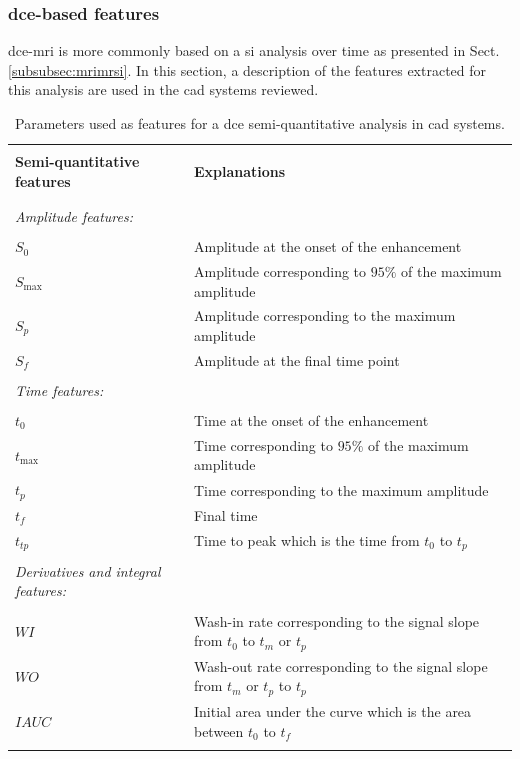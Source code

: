 \subsubsection{\ac{dce}-based features}\label{subsubsec:fddce}

\ac{dce}-\ac{mri} is more commonly based on a \ac{si} analysis over time as presented in Sect. \ref{subsubsec:mrimrsi}. In this section, a description of the features extracted for this analysis are used in the \ac{cad} systems reviewed.

\begin{table}
	\caption{Parameters used as features for a \ac{dce} semi-quantitative analysis in \ac{cad} systems.}
	\small
	\begin{tabular}{p{.35\linewidth} p{.60\linewidth}}
		\hline \\ [-1.5ex]
		\textbf{Semi-quantitative features} & \textbf{Explanations} \\ \\ [-1.5ex]
		\hline \\ [-1.5ex]
		\textit{Amplitude features:} & \\ \\ [-1.5ex]
		\quad $S_0$ & Amplitude at the onset of the enhancement \\
		\quad $S_{\max}$ & Amplitude corresponding to $95\%$ of the maximum amplitude \\
		\quad $S_{p}$ & Amplitude corresponding to the maximum amplitude \\
		\quad $S_f$ & Amplitude at the final time point \\ \\ [-1.5ex]
		\textit{Time features:} & \\ \\ [-1.5ex]
		\quad $t_0$ & Time at the onset of the enhancement \\
		\quad $t_{\max}$ & Time corresponding to $95\%$ of the maximum amplitude \\
		\quad $t_{p}$ & Time corresponding to the maximum amplitude \\
		\quad $t_{f}$ & Final time \\
		\quad $t_{tp}$ & Time to peak which is the time from $t_0$ to $t_p$ \\ \\ [-1.5ex]
		\textit{Derivatives and integral features:} & \\ \\ [-1.5ex]
		\quad $WI$ & Wash-in rate corresponding to the signal slope from $t_0$ to $t_m$ or $t_p$ \\
		\quad $WO$ & Wash-out rate corresponding to the signal slope from $t_m$ or $t_p$ to $t_p$ \\
		\quad $IAUC$ & Initial area under the curve which is the area between $t_0$ to $t_{f}$ \\ \\ [-1.5ex]
		\hline
	\end{tabular}
	\label{tab:semiqua}
\end{table}


